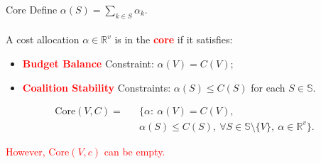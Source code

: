 \documentclass[14pt]{beamer}
\newcommand{\R}{\mathbb{R}}
\begin{document}
\begin{frame}{Core}
Define $\alpha(S)=\sum_{k\in S}\alpha_k$. \\~\\
A cost allocation $\alpha \in \R^v$ is in the \textcolor{red}{\bf core} if it satisfies:
\begin{itemize}
\small
\justifying
	\item \textcolor{red}{\bf Budget Balance} Constraint: $\alpha(V)=C(V)$;
	\item \textcolor{red}{\bf Coalition Stability} Constraints: $\alpha(S)\leq C(S)$ for each  $S\in \mathbb{S}$.
\end{itemize}
\vspace{-12pt}
\begin{eqnarray*}
\mathrm{Core}(V,C) = &&\bigg\{ \alpha:~ \alpha(V)=C(V), \\
&& \alpha(S) \leq C(S), ~\forall S \in \mathbb{S} \setminus \{V\},~\alpha \in \R^v   \bigg\}.
\end{eqnarray*}

\pause
\vspace{-12pt}
\textcolor{red}{However, $\mathrm{Core}(V,c)$ can be empty.}
\end{frame}
\end{document}
